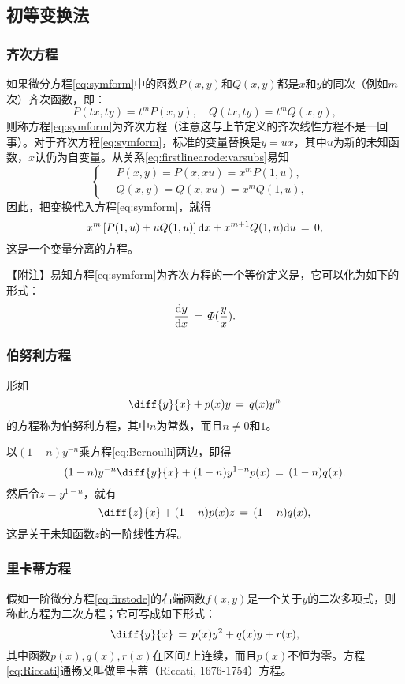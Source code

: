 \subsection{初等变换法}
\subsubsection{齐次方程}
如果微分方程\eqref{eq:symform}中的函数$P(x,y)$和$Q(x,y)$都是$x$和$y$的同次（例如$m$次）齐次函数，即：
\begin{equation}\label{eq:firstlinearode:varsubs}
P(tx,ty)=t^mP(x,y),\quad Q(tx,ty)=t^mQ(x,y),
\end{equation}
则称方程\eqref{eq:symform}为{\heiti 齐次方程}（注意这与上节定义的齐次线性方程不是一回事）。对于齐次方程\eqref{eq:symform}，标准的变量替换是$y=ux$，其中$u$为新的未知函数，$x$认仍为自变量。从关系\eqref{eq:firstlinearode:varsubs}易知
\begin{equation*}
    \begin{cases}
        \quad P(x,y)=P(x,xu)=x^mP(1,u), &\\
        \quad Q(x,y)=Q(x,xu)=x^mQ(1,u), &
    \end{cases}
\end{equation*}
因此，把变换代入方程\eqref{eq:symform}，就得
$$x^m\left[P(1,u)+uQ(1,u)\right]\mathrm{d} x+x^{m+1}Q(1,u)\mathrm{d} u\,=\,0,$$
这是一个变量分离的方程。\par
{\heiti 【附注】\quad}易知方程\eqref{eq:symform}为齐次方程的一个等价定义是，它可以化为如下的形式：
$$\frac{\mathrm{d} y}{\mathrm{d} x}\,=\,\varPhi(\frac yx).$$

\subsubsection{伯努利方程}
\begin{defn}\label{def:eq:Bernoulli}
形如
\begin{equation}\label{eq:Bernoulli}
\diff{y}{x}+p(x)y\,=\,q(x)y^n
\end{equation}
的方程称为伯努利方程，其中$n$为常数，而且$n\neq 0$和$1$。
\end{defn}\par
以$(1-n)y^{-n}$乘方程\eqref{eq:Bernoulli}两边，即得
$$(1-n)y^{-n}\diff{y}{x}+(1-n)y^{1-n}p(x)\,=\,(1-n)q(x).$$
然后令$z=y^{1-n}$，就有
$$\diff{z}{x}+(1-n)p(x)z\,=\,(1-n)q(x),$$
这是关于未知函数$z$的一阶线性方程。

\subsubsection{里卡蒂方程}
\begin{defn}\label{def:eq:Riccati}
假如一阶微分方程\eqref{eq:firstode}的右端函数$f(x,y)$是一个关于$y$的二次多项式，则称此方程为二次方程；它可写成如下形式：
\begin{equation}\label{eq:Riccati}
\diff{y}{x}\,=\,p(x)y^2+q(x)y+r(x),
\end{equation}
其中函数$p(x),q(x),r(x)$在区间$I$上连续，而且$p(x)$不恒为零。方程\eqref{eq:Riccati}通畅又叫做里卡蒂（Riccati, 1676-1754）方程。
\end{defn}

